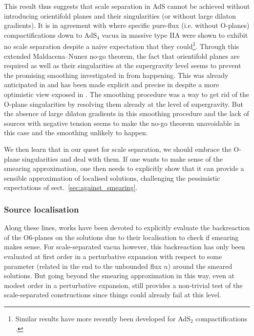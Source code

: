 \documentclass[11pt, a4paper]{article}
\begin{document}
This result thus suggests that scale separation in AdS cannot be achieved without introducing orientifold planes and their singularities (or without large dilaton gradients). It is in agreement with \cite{Tsimpis:2012tu} where specific pure-flux (i.e. without O-planes) compactifications down to AdS$_4$ vacua in massive type IIA were shown to exhibit no scale separation despite a naive expectation that they could\footnote{Similar results have more recently been developed for AdS$_2$ compactifications \cite{Lust:2020npd}.}. Through this extended Maldacena--Nunez no-go theorem, the fact that orientifold planes are required as well as their singularities at the supergravity level seems to prevent the promising smoothing investigated in \cite{Saracco:2012wc,Saracco:2013aoa} from happening. This was already anticipated in \cite{McOrist:2012yc} and has been made explicit and precise in \cite{DeLuca:2021mcj} despite a more optimistic view exposed in \cite{Junghans:2020acz}. The smoothing procedure was a way to get rid of the O-plane singularities by resolving them already at the level of supergravity. But the absence of large dilaton gradients in this smoothing procedure and the lack of sources with negative tension seems to make the no-go theorem unavoidable in this case and the smoothing unlikely to happen.

We then learn that in our quest for scale separation, we should embrace the O-plane singularities and deal with them. If one wants to make sense of the smearing approximation, one then needs to explicitly show that it can provide a sensible approximation of localised solutions, challenging the pessimistic expectations of sect.~\ref{sec:against_smearing}.

\subsubsection{Source localisation}
\label{sec:localisation}

Along these lines, works have been devoted to explicitly evaluate the backreaction of the O6-planes on the solutions due to their localisation to check if smearing makes sense. For scale-separated vacua however, this backreaction has only been evaluated at first order in a perturbative expansion with respect to some parameter (related in the end to the unbounded flux $n$) around the smeared solutions. But going beyond the smearing approximation in this way, even at modest order in a perturbative expansion, still provides a non-trivial test of the scale-separated constructions since things could already fail at this level.
\end{document}
